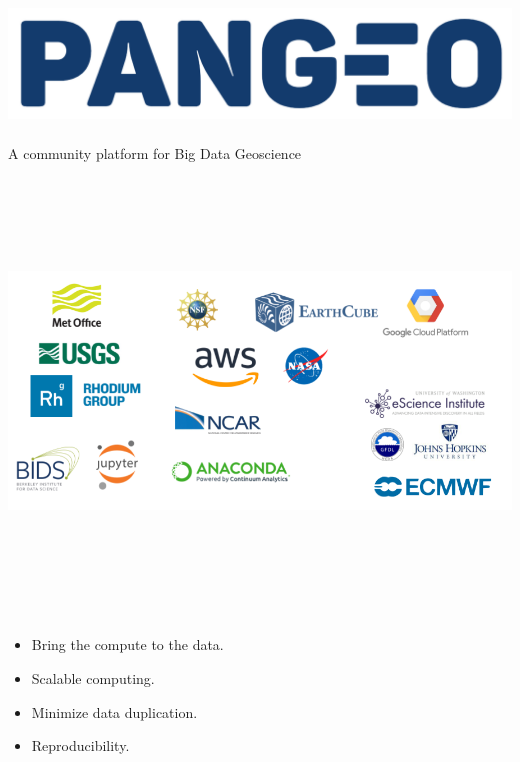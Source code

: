 \documentclass[a0, landscape]{a0poster}
\begin{document}
\begin{multicols}{3}
\begin{center}
\includegraphics[height=4cm]{pangeo-logo}\\
\large A community platform for Big Data Geoscience
\includegraphics[height=12cm]{pangeo-backers}
\end{center}


\begin{minipage}[b]{0.5\linewidth}
\begin{itemize}
\subsection*{Cloud computing}
\item Bring the compute to the data.
\item Scalable computing.
\item Minimize data duplication.
\item Reproducibility.
\end{itemize}
\end{minipage}
\begin{minipage}[b]{0.5\linewidth}

\end{minipage}
\end{multicols}
\end{document}
